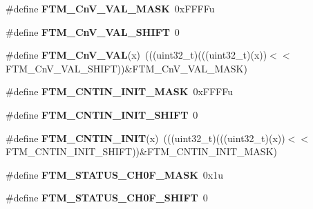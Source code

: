 \begin{DoxyCompactItemize}
\item 
\#define {\bfseries F\+T\+M\+\_\+\+Cn\+V\+\_\+\+V\+A\+L\+\_\+\+M\+A\+SK}~0x\+F\+F\+F\+Fu\hypertarget{group__FTM__Register__Masks_gaebf50ac59c7cc0b853a2a90b117ac395}{}\label{group__FTM__Register__Masks_gaebf50ac59c7cc0b853a2a90b117ac395}

\item 
\#define {\bfseries F\+T\+M\+\_\+\+Cn\+V\+\_\+\+V\+A\+L\+\_\+\+S\+H\+I\+FT}~0\hypertarget{group__FTM__Register__Masks_ga763735cc078e7480124e33026ff2fa22}{}\label{group__FTM__Register__Masks_ga763735cc078e7480124e33026ff2fa22}

\item 
\#define {\bfseries F\+T\+M\+\_\+\+Cn\+V\+\_\+\+V\+AL}(x)~(((uint32\+\_\+t)(((uint32\+\_\+t)(x))$<$$<$F\+T\+M\+\_\+\+Cn\+V\+\_\+\+V\+A\+L\+\_\+\+S\+H\+I\+FT))\&F\+T\+M\+\_\+\+Cn\+V\+\_\+\+V\+A\+L\+\_\+\+M\+A\+SK)\hypertarget{group__FTM__Register__Masks_gaee6cacf155d736fa3c12612eae539dca}{}\label{group__FTM__Register__Masks_gaee6cacf155d736fa3c12612eae539dca}

\item 
\#define {\bfseries F\+T\+M\+\_\+\+C\+N\+T\+I\+N\+\_\+\+I\+N\+I\+T\+\_\+\+M\+A\+SK}~0x\+F\+F\+F\+Fu\hypertarget{group__FTM__Register__Masks_ga5181f522d645ce312209c2258a1a06d0}{}\label{group__FTM__Register__Masks_ga5181f522d645ce312209c2258a1a06d0}

\item 
\#define {\bfseries F\+T\+M\+\_\+\+C\+N\+T\+I\+N\+\_\+\+I\+N\+I\+T\+\_\+\+S\+H\+I\+FT}~0\hypertarget{group__FTM__Register__Masks_ga174caa0423e0d00ae66b8adc3253ce60}{}\label{group__FTM__Register__Masks_ga174caa0423e0d00ae66b8adc3253ce60}

\item 
\#define {\bfseries F\+T\+M\+\_\+\+C\+N\+T\+I\+N\+\_\+\+I\+N\+IT}(x)~(((uint32\+\_\+t)(((uint32\+\_\+t)(x))$<$$<$F\+T\+M\+\_\+\+C\+N\+T\+I\+N\+\_\+\+I\+N\+I\+T\+\_\+\+S\+H\+I\+FT))\&F\+T\+M\+\_\+\+C\+N\+T\+I\+N\+\_\+\+I\+N\+I\+T\+\_\+\+M\+A\+SK)\hypertarget{group__FTM__Register__Masks_gac20c0ad9416a41d291b1fed2313da2ea}{}\label{group__FTM__Register__Masks_gac20c0ad9416a41d291b1fed2313da2ea}

\item 
\#define {\bfseries F\+T\+M\+\_\+\+S\+T\+A\+T\+U\+S\+\_\+\+C\+H0\+F\+\_\+\+M\+A\+SK}~0x1u\hypertarget{group__FTM__Register__Masks_ga9ba703f87542e033b6c311c061ea9187}{}\label{group__FTM__Register__Masks_ga9ba703f87542e033b6c311c061ea9187}

\item 
\#define {\bfseries F\+T\+M\+\_\+\+S\+T\+A\+T\+U\+S\+\_\+\+C\+H0\+F\+\_\+\+S\+H\+I\+FT}~0\hypertarget{group__FTM__Register__Masks_ga4ea6740087a54ad02b40e7cf909f92aa}{}\label{group__FTM__Register__Masks_ga4ea6740087a54ad02b40e7cf909f92aa}


\end{DoxyCompactItemize}
